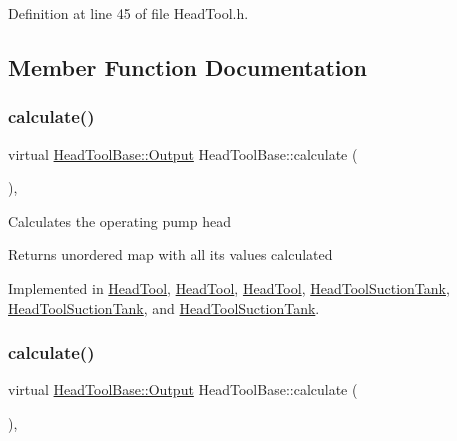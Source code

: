 Definition at line 45 of file Head\+Tool.\+h.



\subsection{Member Function Documentation}
\mbox{\label{class_head_tool_base_a82024c0ce01699aa24509c964267c392}} 
\subsubsection{\texorpdfstring{calculate()}{calculate()}\hspace{0.1cm}{\footnotesize\ttfamily [1/3]}}
{\footnotesize\ttfamily virtual \hyperlink{struct_head_tool_base_1_1_output}{Head\+Tool\+Base\+::\+Output} Head\+Tool\+Base\+::calculate (\begin{DoxyParamCaption}{ }\end{DoxyParamCaption})\hspace{0.3cm}{\ttfamily [protected]}, {}}

Calculates the operating pump head

\begin{DoxyReturn}{Returns}
unordered map with all its values calculated 
\end{DoxyReturn}


Implemented in \hyperlink{class_head_tool_a1d3da7d9d78bdc0b29653a759d7d33af}{Head\+Tool}, \hyperlink{class_head_tool_a1d3da7d9d78bdc0b29653a759d7d33af}{Head\+Tool}, \hyperlink{class_head_tool_a1d3da7d9d78bdc0b29653a759d7d33af}{Head\+Tool}, \hyperlink{class_head_tool_suction_tank_ad91b31b9f524b9892da26e5ecb9e191e}{Head\+Tool\+Suction\+Tank}, \hyperlink{class_head_tool_suction_tank_ad91b31b9f524b9892da26e5ecb9e191e}{Head\+Tool\+Suction\+Tank}, and \hyperlink{class_head_tool_suction_tank_ad91b31b9f524b9892da26e5ecb9e191e}{Head\+Tool\+Suction\+Tank}.

\mbox{\label{class_head_tool_base_a82024c0ce01699aa24509c964267c392}} 
\subsubsection{\texorpdfstring{calculate()}{calculate()}\hspace{0.1cm}{\footnotesize\ttfamily [2/3]}}
{\footnotesize\ttfamily virtual \hyperlink{struct_head_tool_base_1_1_output}{Head\+Tool\+Base\+::\+Output} Head\+Tool\+Base\+::calculate (\begin{DoxyParamCaption}{ }\end{DoxyParamCaption})\hspace{0.3cm}{\ttfamily [protected]}, {}}

